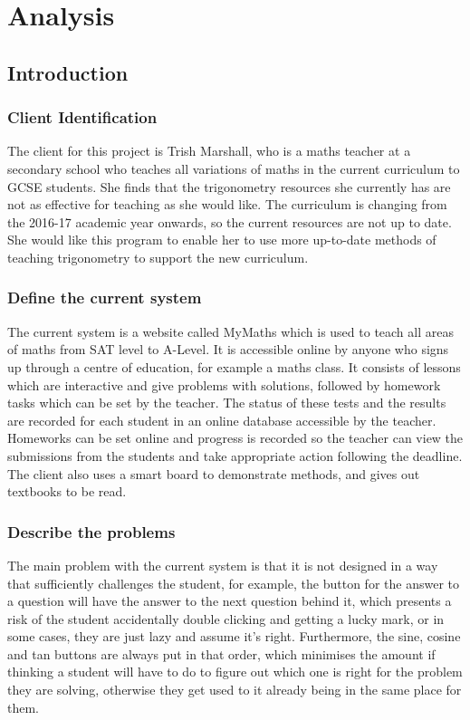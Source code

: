 \chapter{Analysis}

\section{Introduction}

\subsection{Client Identification}

The client for this project is Trish Marshall, who is a maths teacher at a secondary school who teaches all variations of maths in the current curriculum to GCSE students. She finds that the trigonometry resources she currently has are not as effective for teaching as she would like. The curriculum is changing from the 2016-17 academic year onwards, so the current resources are not up to date. She would like this program to enable her to use more up-to-date methods of teaching trigonometry to support the new curriculum.

\subsection{Define the current system}

The current system is a website called MyMaths which is used to teach all areas of maths from SAT level to A-Level. It is accessible online by anyone who signs up through a centre of education, for example a maths class. It consists of lessons which are interactive and give problems with solutions, followed by homework tasks which can be set by the teacher. The status of these tests and the results are recorded for each student in an online database accessible by the teacher. Homeworks can be set online and progress is recorded so the teacher can view the submissions from the students and take appropriate action following the deadline. The client also uses a smart board to demonstrate methods, and gives out textbooks to be read.

\subsection{Describe the problems}

The main problem with the current system is that it is not designed in a way that sufficiently challenges the student, for example, the button for the answer to a question will have the answer to the next question behind it, which presents a risk of the student accidentally double clicking and getting a lucky mark, or in some cases, they are just lazy and assume it's right. Furthermore, the sine, cosine and tan buttons are always put in that order, which minimises the amount if thinking a student will have to do to figure out which one is right for the problem they are solving, otherwise they get used to it already being in the same place for them.


